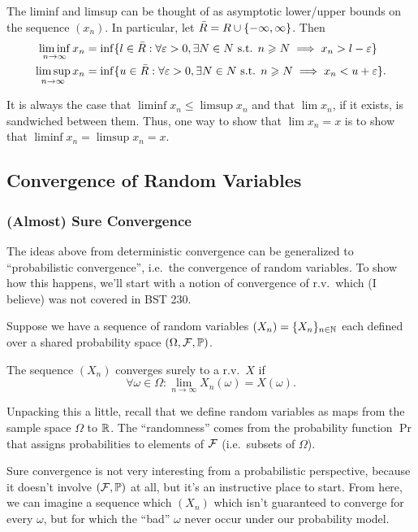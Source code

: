 The liminf and limsup can be thought of as asymptotic lower/upper bounds on 
the sequence $(x_n)$. In particular, let $\bar{R} = R \cup \{-\infty, \infty\}$.
Then 
\begin{align*}
    \liminf_{n \rightarrow \infty} x_n 
        &= \inf \{ l \in \bar{R} : \forall \varepsilon > 0, \exists N \in N \text{ s.t. } n \geqslant N \implies x_n > l - \varepsilon \} \\
    \limsup_{n \rightarrow \infty} x_n 
        &= \inf \{ u \in \bar{R} : \forall \varepsilon > 0, \exists N \in N \text{ s.t. } n \geqslant N \implies x_n < u + \varepsilon \}.
\end{align*}

It is always the case that $\liminf x_n \leq \limsup x_n$ and that $\lim x_n$, if 
it exists, is sandwiched between them. Thus, one way to show that $\lim x_n = x$ 
is to show that $\liminf x_n = \limsup x_n = x$.

\subsection{Convergence of Random Variables}

\subsubsection{(Almost) Sure Convergence}

The ideas above from deterministic convergence can be generalized to 
``probabilistic convergence'', i.e.\ the convergence of random variables.
To show how this happens, we'll start with a notion of convergence of r.v.\ which 
(I believe) was not covered in BST 230. 

Suppose we have a sequence of random variables $(X_n) = \{X_n\}_{n \in \mathbb N}$
each defined over a shared probability space $(\Omega, \mathcal F, \operatorname*{\mathbb{P}})$.

\begin{definition}
    The sequence $(X_n)$ converges surely to a r.v.\ $X$ if 
    \[
        \forall \omega \in \Omega:
        \lim_{n \rightarrow \infty} X_n(\omega) = X(\omega).
    \]
\end{definition}

Unpacking this a little, recall that we define random variables as 
maps from the sample space $\Omega$ to $\mathbb R$. 
The ``randomness'' comes from the probability function $\Pr$ 
that assigns probabilities to elements of $\mathcal F$ (i.e.\ subsets of $\Omega$).

Sure convergence is not very interesting 
from a probabilistic perspective, because it doesn't involve $(\mathcal F, \operatorname*{\mathbb{P}})$
at all, but it's an instructive place to start. 
From here, we can imagine a sequence which $(X_n)$ which isn't guaranteed to
converge for every $\omega$, but for which the ``bad'' $\omega$ never occur 
under our probability model.

